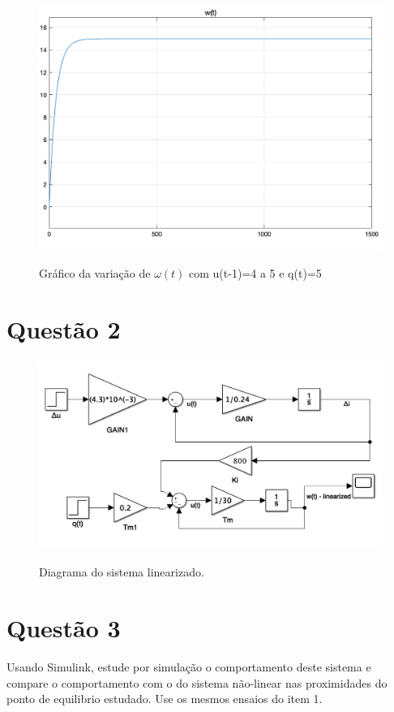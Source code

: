 \documentclass[11pt]{article}
\begin{document}
\begin{figure}[H]
	\centering
	{\includegraphics[width=\textwidth]
		{assets/q1_u(t)_4to5_q(t)_5.png}}
	\caption{ Gráfico da variação de $\omega(t)$ com u(t-1)=4 a 5 e q(t)=5}
\end{figure}

\section{Questão 2}

\begin{figure}[H]
	\centering
	{\includegraphics[width=\textwidth]
		{assets/q2_linearized_schema.jpg}}
	\caption{Diagrama do sistema linearizado.}
\end{figure}

\section{Questão 3}
Usando Simulink, estude por simulação o comportamento deste sistema e compare o comportamento
com o do sistema não-linear nas proximidades do ponto de equilibrio estudado. Use os mesmos ensaios
do item 1.
\end{document}
